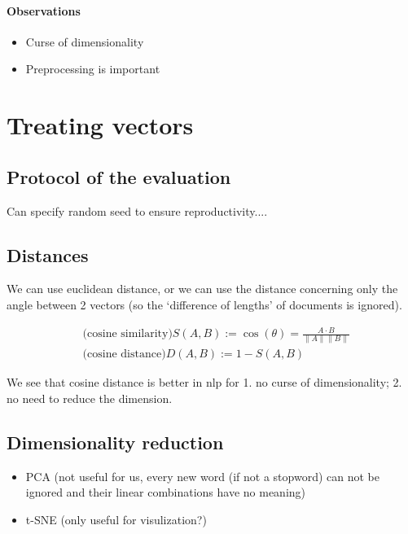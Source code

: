 \documentclass{article}
\begin{document}
\paragraph{Observations}
\begin{itemize}
  \item Curse of dimensionality
  \item Preprocessing is important
\end{itemize}

\section{Treating vectors}

\subsection{Protocol of the evaluation}

Can specify random seed to ensure reproductivity....

\subsection{Distances}

We can use euclidean distance, or we can use the distance concerning
only the angle between 2 vectors (so the `difference of lengths' of documents
is ignored).

$$
\begin{aligned}
&\text{(cosine similarity)}S(A, B) :=
\cos (\theta)=\frac{A \cdot B}{\|A\|\|B\|}\\
&\text{(cosine distance)}D(A, B) :=1-S(A, B)
\end{aligned}
$$

We see that cosine distance is better in nlp for 1. no curse of dimensionality; 2. no
need to reduce the dimension.

\subsection{Dimensionality reduction}

\begin{itemize}
  \item PCA (not useful for us, every new word (if not a stopword) can not be ignored and their linear combinations have no meaning)
  \item t-SNE (only useful for visulization?)
\end{itemize}
\end{document}
